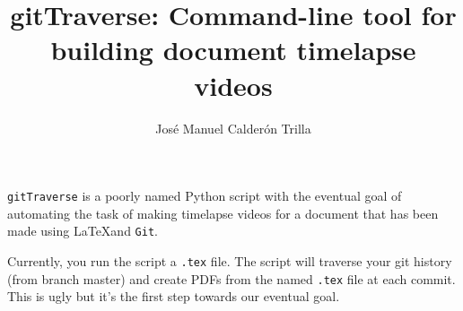 \documentclass{article}
\title{gitTraverse: Command-line tool for building document timelapse videos}
\author{Jos\'{e} Manuel Calder\'{o}n Trilla}
\begin{document}
\verb=gitTraverse= is a poorly named Python script with the eventual goal of automating
the task of making timelapse videos for a document that has been made using \LaTeX and
\verb=Git=.

Currently, you run the script a \verb=.tex= file. The script will traverse your git 
history (from branch master) and create PDFs from the named \verb=.tex= file at
each commit. This is ugly but it's the first step towards our eventual goal.
\end{document}
